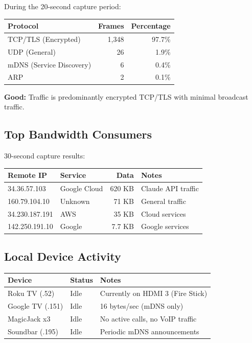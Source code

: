 \documentclass[11pt,letterpaper]{article}
\begin{document}
During the 20-second capture period:

\begin{center}
\begin{tabular}{lrr}
\toprule
\textbf{Protocol} & \textbf{Frames} & \textbf{Percentage} \\
\midrule
TCP/TLS (Encrypted) & 1,348 & 97.7\% \\
UDP (General) & 26 & 1.9\% \\
mDNS (Service Discovery) & 6 & 0.4\% \\
ARP & 2 & 0.1\% \\
\bottomrule
\end{tabular}
\end{center}

\textcolor{goodcolor}{\textbf{Good:}} Traffic is predominantly encrypted TCP/TLS with minimal broadcast traffic.

\subsection{Top Bandwidth Consumers}

30-second capture results:

\begin{center}
\begin{tabular}{llrp{4cm}}
\toprule
\textbf{Remote IP} & \textbf{Service} & \textbf{Data} & \textbf{Notes} \\
\midrule
34.36.57.103 & Google Cloud & 620 KB & Claude API traffic \\
160.79.104.10 & Unknown & 71 KB & General traffic \\
34.230.187.191 & AWS & 35 KB & Cloud services \\
142.250.191.10 & Google & 7.7 KB & Google services \\
\bottomrule
\end{tabular}
\end{center}

\subsection{Local Device Activity}

\begin{center}
\begin{tabular}{llp{6cm}}
\toprule
\textbf{Device} & \textbf{Status} & \textbf{Notes} \\
\midrule
Roku TV (.52) & Idle & Currently on HDMI 3 (Fire Stick) \\
Google TV (.151) & Idle & 16 bytes/sec (mDNS only) \\
MagicJack x3 & Idle & No active calls, no VoIP traffic \\
Soundbar (.195) & Idle & Periodic mDNS announcements \\
\bottomrule
\end{tabular}
\end{center}
\end{document}
